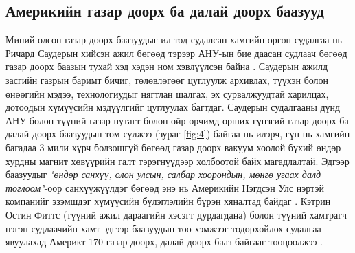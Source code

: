 \documentclass[10pt,twocolumn,letterpaper]{article}
\begin{document}
\subsection{Америкийн газар доорх ба далай доорх баазууд}

Миний олсон газар доорх баазуудыг ил тод судалсан хамгийн өргөн судалгаа нь Ричард Саудерын хийсэн ажил бөгөөд тэрээр АНУ-ын бие даасан судлаач бөгөөд газар доорх баазын тухай хэд хэдэн ном хэвлүүлсэн байна \cite{22}. Саудерын ажилд засгийн газрын баримт бичиг, төлөвлөгөөг цуглуулж архивлах, түүхэн болон өнөөгийн мэдээ, технологиудыг нягтлан шалгах, эх сурвалжуудтай харилцах, дотоодын хүмүүсийн мэдүүлгийг цуглуулах багтдаг. Саудерын судалгааны дүнд АНУ болон түүний газар нутагт болон ойр орчимд орших гүнзгий газар доорх ба далай доорх баазуудын том сүлжээ (зураг \ref{fig:4}) байгаа нь илэрч, гүн нь хамгийн багадаа 3 мили хүрч болзошгүй бөгөөд газар доорх вакуум хоолой бүхий өндөр хурдны магнит хөвүүрийн галт тэрэгнүүдээр холбоотой байх магадлалтай. Эдгээр баазуудыг \textit{"өндөр санхүү, олон улсын, салбар хоорондын, мөнгө угаах далд тоглоом"}-оор санхүүжүүлдэг бөгөөд энэ нь Америкийн Нэгдсэн Улс нэртэй компанийг эзэмшдэг хүмүүсийн бүлэглэлийн бүрэн хяналтад байдаг \cite{22}. Кэтрин Остин Фиттс (түүний ажил дараагийн хэсэгт дурдагдана) болон түүний хамтрагч нэгэн судлаачийн хамт эдгээр баазуудын тоо хэмжээг тодорхойлох судалгаа явуулахад Америкт 170 газар доорх, далай доорх бааз байгааг тооцоолжээ \cite{16,20}.
\end{document}
